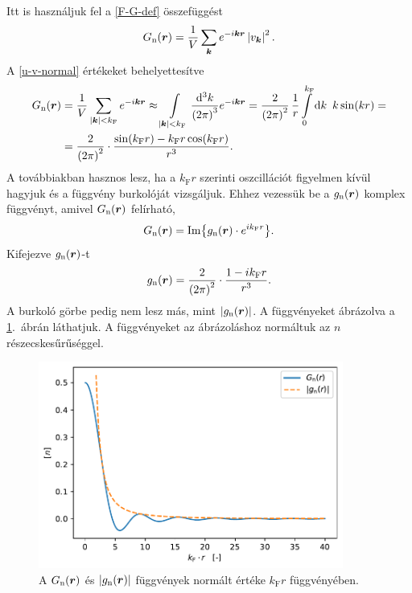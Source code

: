 \documentclass[a4paper,12pt,titlepage]{article}
\newcommand{\KK}{{\vb*{k}}}
\newcommand{\RR}{{\vb*{r}}}
\begin{document}
Itt is használjuk fel a \eqref{F-G-def} összefüggést
\begin{equation}
	G_\text{n}(\RR) = \frac{1}{V} \sum\limits_\KK e^{-i \KK \RR} \left| v_\KK \right|^2.
\end{equation}
A \eqref{u-v-normal} értékeket behelyettesítve
\begin{equation}
\begin{split}
	G_\text{n}(\RR) & = \frac{1}{V} \sum\limits_{\left| \KK \right| < k_\text{F}} e^{-i \KK \RR} \approx \int\limits_{\left| \KK \right| < k_\text{F}} \frac{\dd[3]k}{\left( 2 \pi \right)^3} e^{-i \KK \RR} = \frac{2}{\left( 2 \pi \right)^2} \, \frac{1}{r} \int\limits_0^{k_\text{F}} \dd{k} ~ k \sin(k r) = \\
	& = \frac{2}{\left( 2 \pi \right)^2} \cdot \frac{\sin(k_\text{F} r) - k_\text{F} r \cos(k_\text{F} r)}{r^3}.
\end{split}
\end{equation}
A továbbiakban hasznos lesz, ha a $k_\text{F} r$ szerinti oszcillációt figyelmen kívül hagyjuk és a függvény burkolóját vizsgáljuk.  Ehhez vezessük be a $g_\text{n}(\RR)$ komplex függvényt, amivel $G_\text{n}(\RR)$ felírható,
\begin{equation}
	G_\text{n}(\RR) = \Im{g_\text{n}(\RR) \cdot e^{i k_\text{F} r}}.
\end{equation}
Kifejezve $g_\text{n}(\RR)$-t
\begin{equation}
	g_\text{n}(\RR) = \frac{2}{\left( 2 \pi \right)^2} \cdot \frac{1 - i k_\text{F} r}{r^3}.
\end{equation}
A burkoló görbe pedig nem lesz más, mint $\left| g_\text{n}(\RR) \right|$.  A függvényeket ábrázolva a \ref{G-normal-fig}.\ ábrán láthatjuk.  A függvényeket az ábrázoláshoz normáltuk az $n$ részecskesűrűséggel.
\begin{figure}[h!]
	\centering
	\includegraphics[width=10cm]{G_normal.pdf}
	\caption{A $G_\text{n}(\RR)$ és $\left| g_\text{n}(\RR) \right|$ függvények normált értéke $k_\text{F} r$ függvényében.}
	\label{G-normal-fig}
\end{figure}
\end{document}
